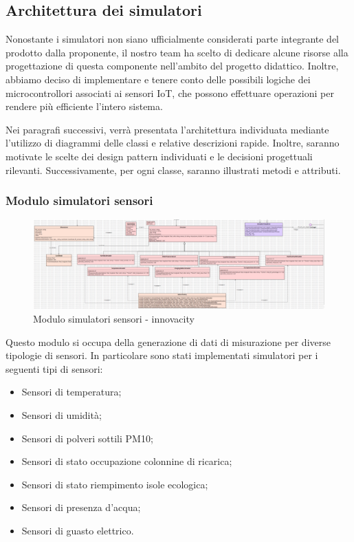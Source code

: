 \subsection{Architettura dei simulatori} \label{sec:architettura_simulatori}
Nonostante i simulatori non siano ufficialmente considerati parte integrante del prodotto dalla proponente, il nostro team ha scelto di dedicare alcune risorse alla progettazione di questa componente nell'ambito del progetto didattico. Inoltre, abbiamo deciso di implementare e tenere conto delle possibili logiche dei microcontrollori associati ai sensori IoT, che possono effettuare operazioni per rendere più efficiente l'intero sistema.

Nei paragrafi successivi, verrà presentata l'architettura individuata mediante l'utilizzo di diagrammi delle classi e relative descrizioni rapide. Inoltre, saranno motivate le scelte dei design pattern individuati e le decisioni progettuali rilevanti. Successivamente, per ogni classe, saranno illustrati metodi e attributi.
\subsubsection{Modulo simulatori sensori}
\begin{figure}[H]
    \centering
    \includegraphics[width=1\textwidth]{../Images/SpecificaTecnica/simulatoriSensori.PNG}
    \caption{Modulo simulatori sensori - innovacity}
    \label{fig: fddf}
\end{figure}
Questo modulo si occupa della generazione di dati di misurazione per diverse tipologie di sensori.
In particolare sono stati implementati simulatori per i seguenti tipi di sensori:
\begin{itemize}
    \item Sensori di temperatura;
    \item Sensori di umidità;
    \item Sensori di polveri sottili PM10;
    \item Sensori di stato occupazione colonnine di ricarica;
    \item Sensori di stato riempimento isole ecologica;
    \item Sensori di presenza d'acqua;
    \item Sensori di guasto elettrico.
\end{itemize}
